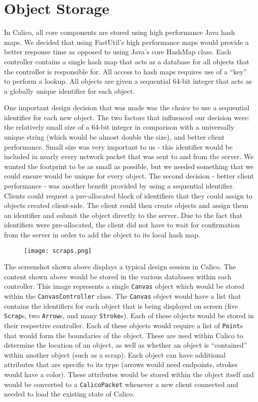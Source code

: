 \section{Object Storage}
In Calico, all core components are stored using high performance Java hash maps. 
We decided that using FastUtil's\cite{fastutil} high performance maps would provide a better response time as opposed to using Java's core HashMap class. 
Each controller contains a single hash map that acts as a database for all objects that the controller is responsible for.
All access to hash maps requires use of a ``key'' to perform a lookup.
All objects are given a sequential 64-bit integer that acts as a globally unique identifier for each object.

One important design decision that was made was the choice to use a sequential identifier for each new object. The two factors that influenced our decision were: the relatively small size of a 64-bit integer in comparison with a universally unique string (which would be almost double the size), and better client performance.
Small size was very important to us - this identifier would be included in nearly every network packet that was sent to and from the server. We wanted the footprint to be as small as possible, but we needed something that we could ensure would be unique for every object. 
The second decision - better client performance - was another benefit provided by using a sequential identifier. Clients could request a pre-allocated block of identifiers that they could assign to objects created client-side. The client could then create objects and assign them an identifier and submit the object directly to the server. Due to the fact that identifiers were pre-allocated, the client did not have to wait for confirmation from the server in order to add the object to its local hash map.

\begin{figure}[htb]
  \centering
  \texttt{[image: scraps.png]}
  \label{fig:scraps_storage}
\end{figure}

The screenshot shown above displays a typical design session in Calico. The content shown above would be stored in the various databases within each controller. This image represents a single \texttt{Canvas} object which would be stored within the \texttt{CanvasController} class. The \texttt{Canvas} object would have a list that contains the identifiers for each object that is being displayed on screen (five \texttt{Scrap}s, two \texttt{Arrow}s, and many \texttt{Stroke}s). Each of these objects would be stored in their respective controller. Each of these objects would require a list of \texttt{Point}s that would form the boundaries of the object. These are used within Calico to determine the location of an object, as well as whether an object is ``contained'' within another object (such as a scrap). Each object can have additional attributes that are specific to its type (arrows would need endpoints, strokes would have a color). These attributes would be stored within the object itself and would be converted to a \texttt{CalicoPacket} whenever a new client connected and needed to load the existing state of Calico.


